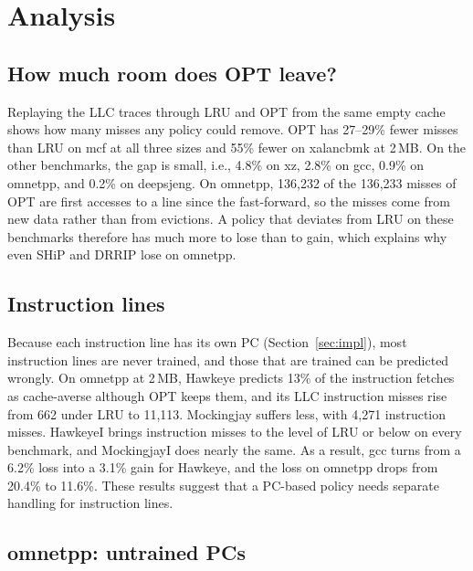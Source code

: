 \documentclass[11pt,conference]{IEEEtran}
\begin{document}
\section{Analysis}
\label{sec:analysis}

\subsection{How much room does OPT leave?}
\label{sec:room}

Replaying the LLC traces through LRU and OPT from the same empty cache shows
how many misses any policy could remove. OPT has 27--29\% fewer misses than LRU
on mcf at all three sizes and 55\% fewer on xalancbmk at 2\,MB. On the other
benchmarks, the gap is small, i.e., 4.8\% on xz, 2.8\% on gcc, 0.9\% on
omnetpp, and 0.2\% on deepsjeng. On omnetpp, 136,232 of the 136,233 misses of
OPT are first accesses to a line since the fast-forward, so the misses come
from new data rather than from evictions. A policy that deviates from LRU on
these benchmarks therefore has much more to lose than to gain, which explains
why even SHiP and DRRIP lose on omnetpp.

\subsection{Instruction lines}

Because each instruction line has its own PC (Section~\ref{sec:impl}), most
instruction lines are never trained, and those that are trained can be
predicted wrongly. On omnetpp at 2\,MB, Hawkeye predicts
13\% of the instruction fetches as cache-averse although OPT keeps them, and
its LLC instruction misses rise from 662 under LRU to 11,113. Mockingjay
suffers less, with 4,271 instruction misses. HawkeyeI brings instruction misses
to the level of LRU or below on every benchmark, and MockingjayI does nearly
the same. As a result, gcc turns from a 6.2\% loss into a 3.1\% gain for
Hawkeye, and the loss on omnetpp drops from 20.4\% to 11.6\%. These results
suggest that a PC-based policy needs separate handling for instruction lines.

\subsection{omnetpp: untrained PCs}
\label{sec:omnetpp}
\end{document}
